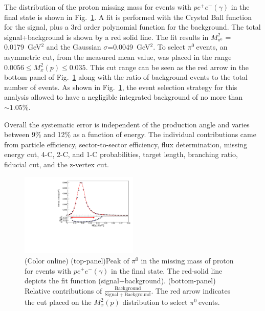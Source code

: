 \documentclass[aps,prc,twocolumn,floatfix,showpacs,preprintnumbers,amsmath,amssymb,superscriptaddress]{revtex4-1}
\def\pizT{$\pi^{0} \ $}
\begin{document}
The distribution of the proton missing mass for events
with $pe^+e^-(\gamma)$ in the final state is shown in 
Fig.~\ref{fig:pi0_peak}. A fit is performed with the Crystal Ball 
function~\cite{Ball1,Ball2} for the signal, plus a 3rd 
order polynomial function for the background. The total signal+background is shown by a red solid line. The fit results in $M_{\pi^0}^2$ = 
0.0179~GeV$^2$ and the Gaussian $\sigma$=0.0049~GeV$^2$. To select \pizT events, 
an asymmetric cut, from the measured mean value, was placed in the range $0.0056 \le  M_x^2(p) \le 0.035$. This cut range can be seen as the red arrow in the bottom panel of Fig.~\ref{fig:pi0_peak} along with the ratio of background events to the total number of events.
As shown in Fig.~\ref{fig:pi0_peak}, the event selection strategy for this analysis allowed to have a negligible integrated background of no more than $\sim1.05\%$.

Overall the systematic error is independent of the production angle and varies 
between 9\% and 12\% as a function of energy. The 
individual contributions came from particle efficiency, 
sector-to-sector efficiency, flux determination, missing energy cut, 
4-C, 2-C, and 1-C probabilities, target length, branching 
ratio, fiducial cut, and the z-vertex cut.
\begin{figure}[htb!]
\centerline{
        \includegraphics[height=0.4\textwidth,width=0.5\textwidth]{G12_Pi0_wBck.pdf}}

        \caption {(Color online) (top-panel)Peak of $\pi^0$ in the missing
                mass of proton for events with $pe^+e^-(\gamma)$
                in the final state. The red-solid line depicts the fit function (signal+background).
                (bottom-panel) Relative contributions of $\frac{\mathrm{Background}}{\mathrm{Signal + Background}}$. The red arrow indicates the cut placed on the $M_x^2(p)$ distribution to select \pizT events.} \label{fig:pi0_peak}
\end{figure}
\end{document}
